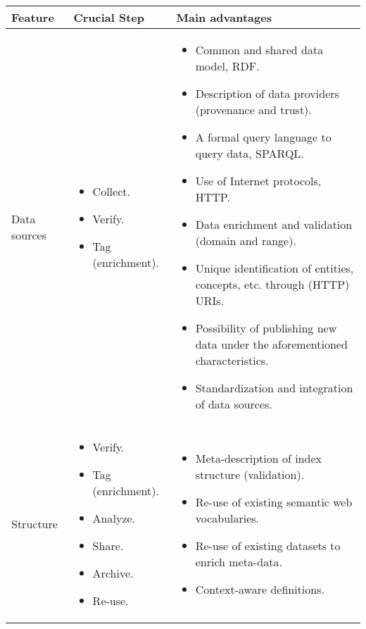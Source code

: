  
\begin{table}[!htb]
\renewcommand{\arraystretch}{1.3}
\begin{center}
\begin{tabular}{|p{3cm}|p{3.5cm}|p{6.5cm}|}
\hline
  \textbf{Feature} & \textbf{Crucial Step} &\textbf{Main advantages}  \\  \hline
  Data sources &  \begin{itemize} \item Collect. \item Verify. \item Tag (enrichment).\end{itemize} & \begin{itemize}
		      \item Common and shared data model, RDF.
		      \item Description of data providers (provenance and trust).
		      \item A formal query language to query data, SPARQL.
		      \item Use of Internet protocols, HTTP.
		      \item Data enrichment and validation (domain and range).
		      \item Unique identification of entities, concepts, etc. through (HTTP) URIs.
		      \item Possibility of publishing new data under the aforementioned characteristics.
		      \item Standardization and integration of data sources.
		    \end{itemize} \\ \hline  
  Structure & \begin{itemize} \item Verify. \item Tag (enrichment). \item Analyze. \item Share. \item Archive. \item Re-use. \end{itemize} & \begin{itemize}
                  \item Meta-description of index structure (validation).
                  \item Re-use of existing semantic web vocabularies.
                  \item Re-use of existing datasets to enrich meta-data.
                  \item Context-aware definitions.

\end{itemize}
\end{tabular}
\end{center}
\end{table}
